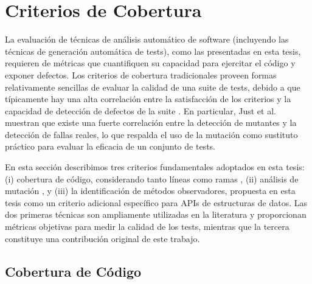 



\section{Criterios de Cobertura}
\label{sec:coverage}
La evaluación de técnicas de análisis automático de software (incluyendo las
técnicas de generación automática de tests), como las presentadas en esta tesis, requieren de métricas que cuantifiquen su capacidad para ejercitar el código y exponer defectos. 
Los criterios de cobertura tradicionales proveen formas relativamente sencillas de evaluar 
la calidad de una suite de tests, debido a que típicamente hay una alta correlación entre
la satisfacción de los criterios y la capacidad de detección de defectos de la
suite \cite{Ammann16,just2014mutants}. 
En particular, Just et al.~\cite{just2014mutants} muestran que existe una fuerte
correlación entre la detección de mutantes y la detección de fallas reales, lo
que respalda el uso de la mutación como sustituto práctico para evaluar la
eficacia de un conjunto de tests.

En esta sección describimos tres criterios fundamentales adoptados en esta tesis: 
(i) cobertura de código, considerando tanto líneas como ramas \cite{Ammann16,myzili2012coverage}, 
(ii) análisis de mutación \cite{jia2011analysis,Ammann16,just2014mutants}, 
y  (iii) la identificación de métodos observadores, propuesta en esta tesis como un criterio adicional
específico para APIs de estructuras de datos. 
Las dos primeras técnicas son ampliamente utilizadas en la literatura y proporcionan 
métricas objetivas para medir la calidad de los tests, mientras que la tercera constituye
una contribución original de este trabajo.

\subsection{Cobertura de Código}

